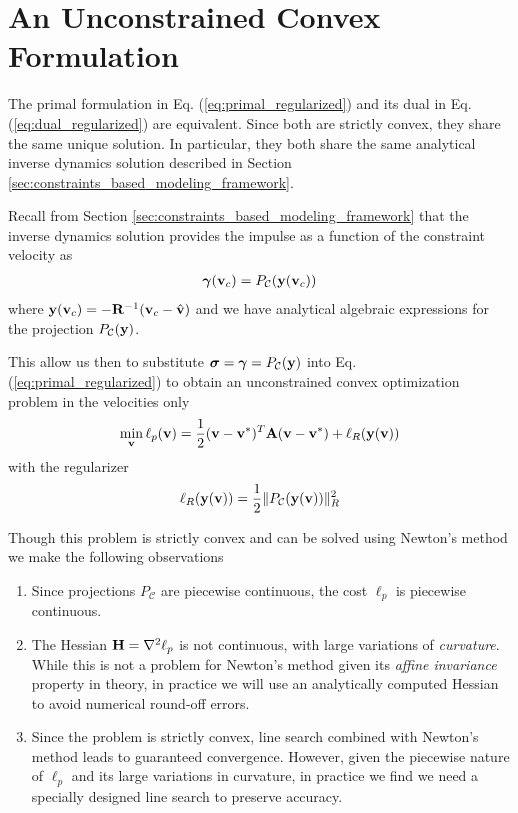 \section{An Unconstrained Convex Formulation}
\label{sec:unconstrained_convex_formulation}

The primal formulation in Eq. (\ref{eq:primal_regularized}) and its dual in Eq.
(\ref{eq:dual_regularized}) are equivalent. Since both are strictly convex, they
share the same unique solution. In particular, they both share the same
analytical inverse dynamics solution described in Section
\ref{sec:constraints_based_modeling_framework}.

Recall from Section \ref{sec:constraints_based_modeling_framework} that the
inverse dynamics solution provides the impulse as a function of the constraint
velocity as
\begin{eqnarray}
	{\bm\gamma}({\mathbf{v}}_c) = P_\mathcal{C}({\mathbf{y}}({\mathbf{v}}_c))
\end{eqnarray}
where ${\mathbf{y}}({\mathbf{v}}_c) = -{\mathbf{R}}^{-1}({\mathbf{v}}_c-\hat{{\mathbf{v}}})$ and we have
analytical algebraic expressions for the projection $P_\mathcal{C}({\mathbf{y}})$.

This allow us then to substitute ${\bm\sigma}={\bm\gamma}=P_\mathcal{C}({\mathbf{y}})$
into Eq. (\ref{eq:primal_regularized}) to obtain an unconstrained convex
optimization problem in the velocities only
\begin{eqnarray}
	\min_{\mf{v}} \ell_p(\mf{v}) =
	\frac{1}{2}(\mf{v}-\mf{v}^*)^T\mf{A}(\mf{v}-\mf{v}^*) +
	\ell_R(\mf{y}(\mf{v}))
	\label{eq:primal_unconstrained}
\end{eqnarray}
with the regularizer
\begin{equation}
	\ell_R({\mathbf{y}}({\mathbf{v}})) = \frac{1}{2}\Vert P_\mathcal{C}({\mathbf{y}}({\mathbf{v}}))\Vert_R^2
\end{equation}

Though this problem is strictly convex and can be solved using Newton's method
we make the following observations
\begin{enumerate}
	\item Since projections $P_\mathcal{C}$ are piecewise continuous, the cost
	$\ell_p$ is piecewise continuous.
	\item The Hessian ${\mathbf{H}}=\nabla^2\ell_p$ is not continuous, with large
	variations of \textit{curvature}. While this is not a problem for Newton's
	method given its \textit{affine invariance} property in theory, in practice
	we will use an analytically computed Hessian to avoid numerical round-off
	errors.
	\item\label{item:line_sarch} Since the problem is strictly convex, line
	search combined with Newton's method leads to guaranteed convergence.
	However, given the piecewise nature of $\ell_p$ and its large variations in
	curvature, in practice we find we need a specially designed line search to
	preserve accuracy.
\end{enumerate}

